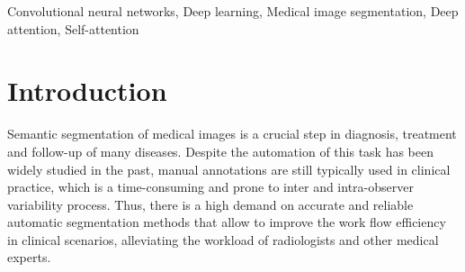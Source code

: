 \documentclass[journal]{IEEEtran}
\begin{document}
\begin{IEEEkeywords}
Convolutional neural networks, Deep learning, Medical image segmentation, Deep attention, Self-attention
\end{IEEEkeywords}


\maketitle %

\section{Introduction}


Semantic segmentation of medical images is a crucial step in diagnosis, treatment and follow-up of many diseases. Despite the automation of this task has been widely studied in the past, manual annotations are still typically used in clinical practice, which is a time-consuming and prone to inter and intra-observer variability process. Thus, there is a high demand on accurate and reliable automatic segmentation methods that allow to improve the work flow efficiency in clinical scenarios, alleviating the workload of radiologists and other medical experts.  



\end{document}
